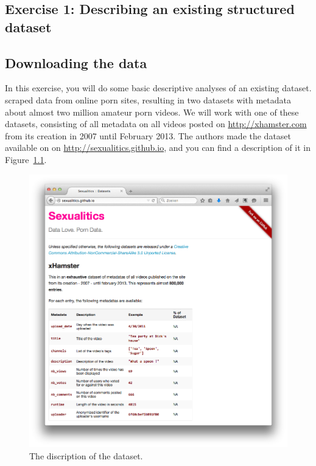 \documentclass[a4paper,12pt]{book}
\begin{document}
\begin{appendices}
	\appendix

\chapter[Exercise 1]{Exercise 1: Describing an existing structured dataset}
\section{Downloading the data}
In this exercise, you will do some basic descriptive analyses of an existing dataset. \cite{mazieres2014} scraped data from online porn sites, resulting in two datasets with  metadata about almost two million amateur porn videos. We will work with one of these datasets, consisting of all metadata on all videos posted on \url{http://xhamster.com} from its creation in 2007 until February 2013. The authors made the dataset available on on \url{http://sexualitics.github.io}, and you can find a description of it in Figure~\ref{fig:sexualitics}.

\begin{figure}[h]
\centering
\includegraphics[width=.75\paperwidth,keepaspectratio]{../pictures/sexualitics.png}
\caption{\label{fig:sexualitics}The discription of the dataset.}
\end{figure}


\end{appendices}
\end{document}
